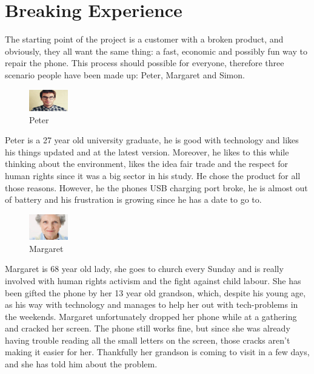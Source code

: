 \documentclass[final]{scrreprt} %
\begin{document}
\chapter{Breaking Experience}%
\label{ch:breaking-experience}
The starting point of the project is a customer with a broken product, and obviously, they all want the same thing: a fast, economic and possibly fun way to repair the phone. This process should possible for everyone, therefore three scenario people have been made up: Peter, Margaret and Simon.

\begin{figure}
	\centering
	\includegraphics[width=0.15\textwidth]{./images/Peter}
	\caption{\label{fig:Peter}Peter}
\end{figure}

Peter is a 27 year old university graduate, he is good with technology and likes his things updated and at the latest version. Moreover, he likes to this while thinking about the environment, likes the idea fair trade and the respect for human rights since it was a big sector in his study. He chose the product for all those reasons. However, he the phones USB charging port broke, he is almost out of battery and his frustration is growing since he has a date to go to. 

\begin{figure}
	\centering
	\includegraphics[width=0.15\textwidth]{./images/Margaret}
	\caption{\label{fig:Margaret}Margaret}
\end{figure}

Margaret is 68 year old lady, she goes to church every Sunday and is really involved with human rights activism and the fight against child labour. She has been gifted the phone by her 13 year old grandson, which, despite his young age, as his way with technology and manages to help her out with tech-problems in the weekends. Margaret unfortunately dropped her phone while at a gathering and cracked her screen. The phone still works fine, but since she was already having trouble reading all the small letters on the screen, those cracks aren't making it easier for her. Thankfully her grandson is coming to visit in a few days, and she has told him about the problem.
\end{document}
